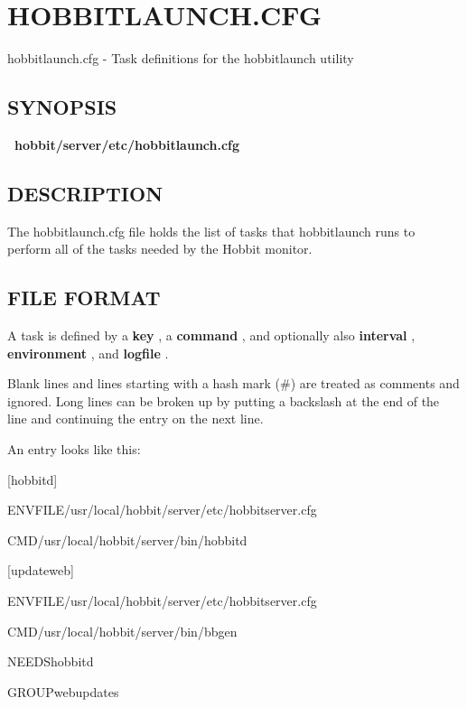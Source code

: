 %
\newpage
\section{HOBBITLAUNCH.CFG}

 hobbitlaunch.cfg - Task definitions for the hobbitlaunch utility 

 
\subsection{SYNOPSIS}
\textbf{~hobbit/server/etc/hobbitlaunch.cfg}


 
\subsection{DESCRIPTION}
 The hobbitlaunch.cfg file holds the list of tasks that hobbitlaunch
 runs to perform all of the tasks needed by the Hobbit monitor. 


 
\subsection{FILE FORMAT}
 A task is defined by a \textbf{key}
, a \textbf{command}
, and optionally also \textbf{interval}
, \textbf{environment}
, and \textbf{logfile}
. 

  Blank lines and lines starting with a hash mark (\#) are treated as
  comments and ignored. Long lines can be broken up by putting a
  backslash at the end of the line and continuing the entry on the
  next line. 



  An entry looks like this: 


  
[hobbitd]  
 
ENVFILE/usr/local/hobbit/server/etc/hobbitserver.cfg  
 
CMD/usr/local/hobbit/server/bin/hobbitd 


  
[updateweb]  
 
ENVFILE/usr/local/hobbit/server/etc/hobbitserver.cfg  
 
CMD/usr/local/hobbit/server/bin/bbgen  
 
NEEDShobbitd  
 
GROUPwebupdates  
 
